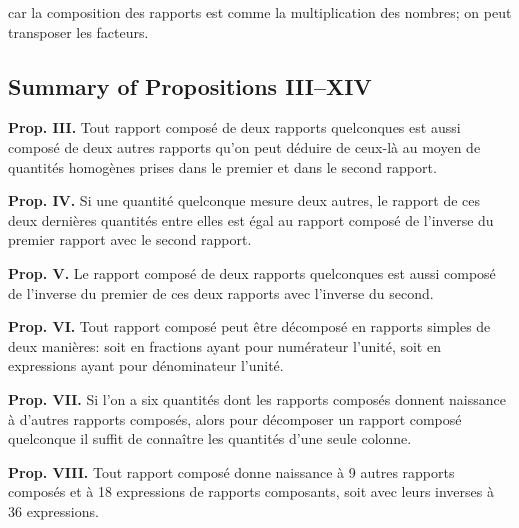 \documentclass[11pt,a4paper]{article}
\theoremstyle{plain}
\theoremstyle{definition}
\theoremstyle{remark}
\begin{document}
car la composition des rapports est comme la multiplication des nombres; on peut transposer les facteurs.








\subsection{Summary of Propositions III–XIV}

\label{sec:prop3-14}





\textbf{Prop. III.} Tout rapport composé de deux rapports quelconques est aussi composé de deux autres rapports qu'on peut déduire de ceux-là au moyen de quantités homogènes prises dans le premier et dans le second rapport.



\textbf{Prop. IV.} Si une quantité quelconque mesure deux autres, le rapport de ces deux dernières quantités entre elles est égal au rapport composé de l'inverse du premier rapport avec le second rapport.



\textbf{Prop. V.} Le rapport composé de deux rapports quelconques est aussi composé de l'inverse du premier de ces deux rapports avec l'inverse du second.



\textbf{Prop. VI.} Tout rapport composé peut être décomposé en rapports simples de deux manières: soit en fractions ayant pour numérateur l'unité, soit en expressions ayant pour dénominateur l'unité.



\textbf{Prop. VII.} Si l'on a six quantités dont les rapports composés donnent naissance à d'autres rapports composés, alors pour décomposer un rapport composé quelconque il suffit de connaître les quantités d'une seule colonne.



\textbf{Prop. VIII.} Tout rapport composé donne naissance à 9 autres rapports composés et à 18 expressions de rapports composants, soit avec leurs inverses à 36 expressions.
\end{document}
